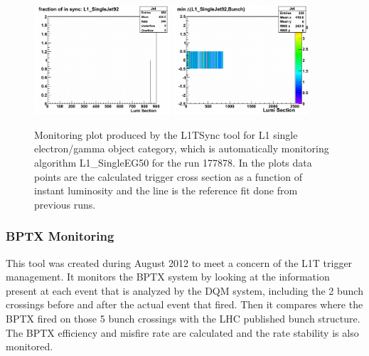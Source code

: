 \begin{figure}[!htb]
\centering
\includegraphics[width=0.45\textwidth]{Chapter03/L1TOnline/Images/Run177878_Jet_SynchronizationCertification.png}
\includegraphics[width=0.45\textwidth]{Chapter03/L1TOnline/Images/Run177878_Jet_SynchronizationTest.png}
\caption{Monitoring plot produced by the L1TSync tool for L1 single electron/gamma object category, which is
automatically monitoring algorithm L1\_SingleEG50 for the run 177878. In the plots data points are the calculated
trigger cross section as a function of instant luminosity and the line is the reference fit done from previous runs.}
\label{figure_ServiceWork_L1TSync}
\end{figure}

\subsubsection{BPTX Monitoring}


This tool was created during August 2012 to meet a concern of the \gls{L1T} trigger management. It monitors the \gls{BPTX} system by looking at the information present at each event that 
is analyzed by the \gls{DQM} system, including the 2 bunch crossings before and after the actual event that fired. Then it 
compares where the \gls{BPTX} fired on those 5 bunch crossings with the LHC published bunch structure. The \gls{BPTX} efficiency 
and misfire rate are calculated and the rate stability is also monitored.

